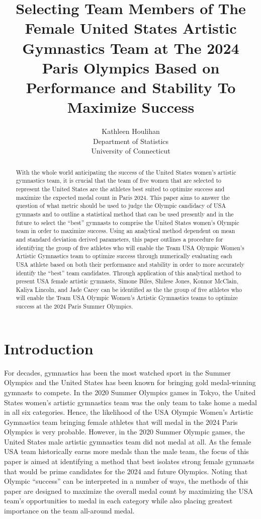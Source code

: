 \documentclass[12pt]{article}
\title{Selecting Team Members of The Female United States Artistic Gymnastics Team at The 2024 Paris Olympics 
Based on Performance and Stability To Maximize Success}
\author{Kathleen Houlihan\\
  Department of Statistics\\
  University of Connecticut
}
\begin{document}
\maketitle

\begin{abstract}
    
  With the whole world anticipating the success of the United States women's artistic gymnastics team, 
  it is crucial that the team of five women that are selected to represent the United States 
  are the athletes best suited to optimize success and maximize the expected medal count in Paris 2024. 
  This paper aims to answer the question of what metric should be used to judge the Olympic candidacy of USA 
  gymnasts and to outline a statistical method that can be used presently and in the future to select the ``best'' 
  gymnasts to comprise the United States women's Olympic team in order to maximize success. Using an analytical 
  method dependent on mean and standard deviation derived parameters, this paper outlines a procedure for identifying 
  the group of five athletes who will enable the Team USA Olympic Women’s Artistic Gymnastics team to optimize 
  success through numerically evaluating each USA athlete based on both their performance and stability in order to 
  more accurately identify the ``best'' team candidates. Through application of this analytical method to present 
  USA female artistic gymnasts, Simone Biles, Shilese Jones, Konnor McClain, Kaliya Lincoln, and Jade Carey can be 
  identified as the the group of five athletes who will enable the Team USA Olympic Women’s Artistic Gymnastics 
  teams to optimize success at the 2024 Paris Summer Olympics.

\end{abstract}

\section{Introduction}
\label{sec:intro}

For decades, gymnastics has been the most watched sport in the Summer Olympics and the United 
States has been known for bringing gold medal-winning gymnasts to compete. In the 2020 
Summer Olympics games in Tokyo, the United States women's artistic gymnastics team was the only team to take 
home a medal in all six categories. Hence, the likelihood of the USA Olympic Women’s Artistic Gymnastics 
team bringing female athletes that will medal in the 2024 Paris Olympics is very probable. 
However, in the 2020 Summer Olympic games, the United States 
male artistic gymnastics team did not medal at all. As the female USA team historically earns more medals than 
the male team, the focus of this paper is aimed at identifying a method that best isolates strong female gymnasts 
that would be prime candidates for the 2024 and future Olympics. Noting that Olympic ``success'' can be interpreted in a number 
of ways, the methods of this 
paper are designed to maximize the overall medal count by maximizing the USA team's opportunities to medal in each 
category while also placing greatest importance on the team all-around medal. 
\end{document}
